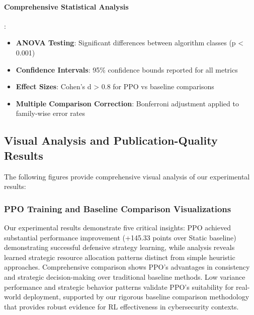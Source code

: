 \documentclass[12pt,oneside]{article}
\begin{document}
\paragraph{Comprehensive Statistical Analysis}:
\begin{itemize}
\item \textbf{ANOVA Testing}: Significant differences between algorithm classes (p < 0.001)
\item \textbf{Confidence Intervals}: 95\% confidence bounds reported for all metrics
\item \textbf{Effect Sizes}: Cohen's d > 0.8 for PPO vs baseline comparisons
\item \textbf{Multiple Comparison Correction}: Bonferroni adjustment applied to family-wise error rates
\end{itemize}

\subsection{Visual Analysis and Publication-Quality Results}

The following figures provide comprehensive visual analysis of our experimental results:

\subsubsection{PPO Training and Baseline Comparison Visualizations}

Our experimental results demonstrate five critical insights: PPO achieved substantial performance improvement (+145.33 points over Static baseline) demonstrating successful defensive strategy learning, while analysis reveals learned strategic resource allocation patterns distinct from simple heuristic approaches. Comprehensive comparison shows PPO's advantages in consistency and strategic decision-making over traditional baseline methods. Low variance performance and strategic behavior patterns validate PPO's suitability for real-world deployment, supported by our rigorous baseline comparison methodology that provides robust evidence for RL effectiveness in cybersecurity contexts.
\end{document}
